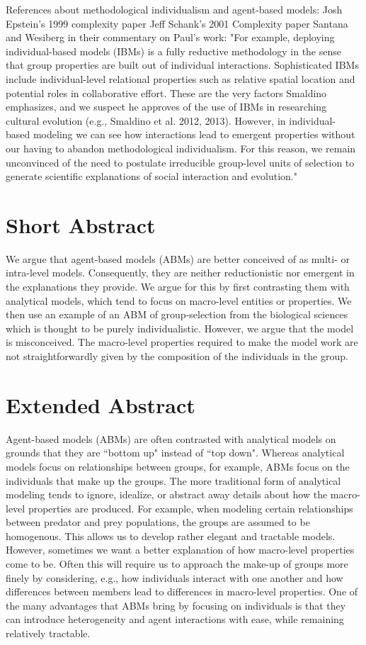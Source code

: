 \documentclass[11pt]{article}
\begin{document}
References about methodological individualism and agent-based models:
Josh Epstein's 1999 complexity paper
Jeff Schank's 2001 Complexity paper
Santana and Wesiberg in their commentary on Paul's work: "For example, deploying individual-based models (IBMs) is a fully reductive methodology in the sense that group properties are built out of individual interactions. Sophisticated IBMs include individual-level relational properties such as relative spatial location and potential roles in collaborative effort. These are the very factors Smaldino emphasizes, and we suspect he approves of the use of IBMs in researching cultural evolution (e.g., Smaldino et al. 2012, 2013). However, in individual- based modeling we can see how interactions lead to emergent properties without our having to abandon methodological individualism. For this reason, we remain unconvinced of the need to postulate irreducible group-level units of selection to generate scientific explanations of social interaction and evolution."

\section*{Short Abstract}

We argue that agent-based models (ABMs) are better conceived of as multi- or intra-level models. Consequently, they are neither reductionistic nor emergent in the explanations they provide. We argue for this by first contrasting them with analytical models, which tend to focus on macro-level entities or properties. We then use an example of an ABM of group-selection from the biological sciences which is thought to be purely individualistic. However, we argue that the model is misconceived. The macro-level properties required to make the model work are not straightforwardly  given by the composition of the individuals in the group.

\section*{Extended Abstract}


Agent-based models (ABMs) are often contrasted with analytical models on grounds that they are ``bottom up" instead of ``top down". Whereas analytical models focus on relationships between groups, for example, ABMs focus on the individuals that make up the groups. The more traditional form of analytical modeling tends to ignore, idealize, or abstract away details about how the macro-level properties are produced. For example, when modeling certain relationships between predator and prey populations, the groups are assumed to be homogenous.  This allows us to develop rather elegant and tractable models. However, sometimes we want a better explanation of how macro-level properties come to be. Often this will require us to approach the make-up of groups more finely by considering, e.g., how individuals interact with one another and how differences between members lead to differences in macro-level properties. One of the many advantages that ABMs bring by focusing on individuals is that they can introduce heterogeneity and agent interactions with ease, while remaining relatively tractable.
\end{document}

